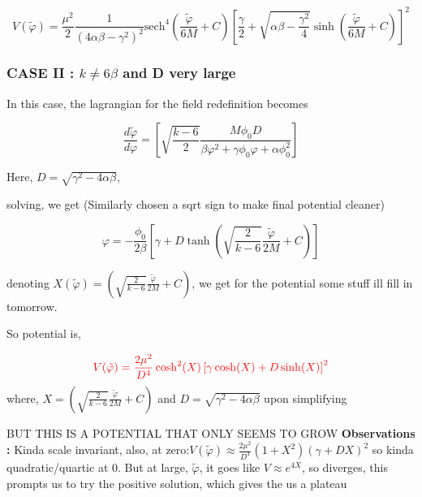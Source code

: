\documentclass{article}
\begin{document}
\begin{equation}
    V(\tilde{\varphi}) = \frac{\mu^2}{2} \frac{1}{(4\alpha\beta-\gamma^2)^2} \text{sech}^4\left(\frac{\tilde{\varphi}}{6M}+C \right) \left[\frac{\gamma }{2} + \sqrt{\alpha\beta-\frac{\gamma^2}{4}} \sinh\left(\frac{\tilde{\varphi}}{6M}+C \right) \right]^2
\end{equation}

\subsubsection{CASE II : $k \neq 6\beta$ and D very large}

In this case, the lagrangian for the field redefinition becomes

\begin{equation}
    \frac{d\tilde{\varphi}}{d\varphi} = \left[ \sqrt{\frac{k-6}{2}} \frac{M \phi_0 D}{\beta \varphi^2  +\gamma \phi_0 \varphi +\alpha \phi^2_0} \right]
\end{equation}

Here,  $D = \sqrt{ \gamma^2-4\alpha \beta}$, 

solving, we get (Similarly chosen a sqrt sign to make final potential cleaner)

\begin{equation}
    \varphi = -\frac{\phi_0}{2 \beta} \left[ \gamma + D\tanh \left( \sqrt{\frac{2}{k-6}} \frac{\tilde{\varphi}}{2M} + C \right) \right]
\end{equation}

denoting $X(\tilde{\varphi}) = \left( \sqrt{\frac{2}{k-6}} \frac{\tilde{\varphi}}{2M} + C \right)$, we get for the potential some stuff ill fill in tomorrow.

So potential is, 

\begin{equation}
    \color{red} V(\tilde{\varphi}) =  \frac{2\mu^2}{D^4} \cosh^2(X)  \left[\gamma \cosh(X)  + D \sinh(X)  \right]^2
\end{equation}
where, 
$X = \left( \sqrt{\frac{2}{k-6}} \frac{\tilde{\varphi}}{2M} + C \right)$ and $D = \sqrt{\gamma^2-4\alpha\beta}$ upon simplifying

BUT THIS IS A POTENTIAL THAT ONLY SEEMS TO GROW \textbf{Observations : } Kinda scale invariant, also, at zero:$ V(\tilde{\varphi}) \approx  \frac{2\mu^2}{D^4} (1 + X^2) (\gamma + DX)^2$
so kinda quadratic/quartic at 0. But at large, $\tilde{\varphi}$, it goes like $V \approx e^{4X}$, so diverges, this prompts us to try the positive solution, which gives the us a plateau
\end{document}
